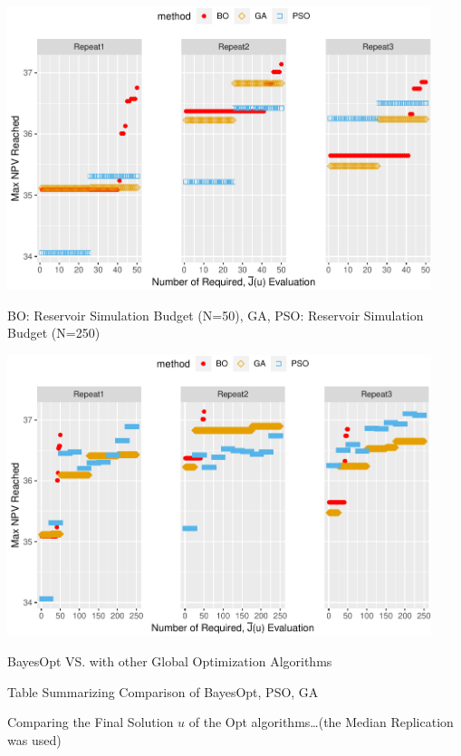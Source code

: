\documentclass[]{elsarticle} %
\begin{document}
\begin{center}\includegraphics[width=468px]{0_Paper1_main_files/figure-latex/unnamed-chunk-11-1} \end{center}

BO: Reservoir Simulation Budget (N=50), GA, PSO: Reservoir Simulation Budget (N=250)

\begin{center}\includegraphics[width=468px]{0_Paper1_main_files/figure-latex/unnamed-chunk-12-1} \end{center}

BayesOpt VS. with other Global Optimization Algorithms

Table Summarizing Comparison of BayesOpt, PSO, GA

Comparing the Final Solution \(u\) of the Opt algorithms\ldots(the Median Replication was used)
\end{document}
